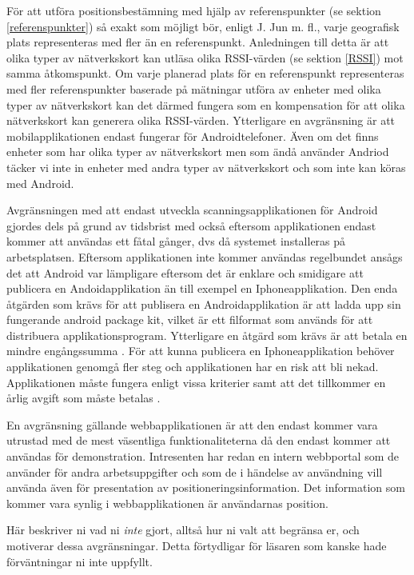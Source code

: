 \documentclass[swedish, a4paper,12pt]{article}
\begin{document}
För att utföra positionsbestämning med hjälp av referenspunkter (se sektion \ref{referenspunkter}) så exakt som möjligt bör, enligt J. Jun m. fl., varje geografisk plats representeras med fler än en referenspunkt\cite{jun2018low}.
Anledningen till detta är att olika typer av nätverkskort kan utläsa olika RSSI-värden (se sektion \ref{RSSI}) mot samma åtkomspunkt\cite{problem_with_RSSI}. Om varje planerad plats för en referenspunkt representeras med fler referenspunkter baserade på mätningar utföra av enheter med olika typer av nätverkskort kan det därmed fungera som en kompensation för att olika nätverkskort kan generera olika RSSI-värden\cite{jun2018low}.
Ytterligare en avgränsning är att mobilapplikationen endast fungerar för Androidtelefoner. Även om det finns enheter som har olika typer av nätverkskort men som ändå använder Andriod täcker vi inte in enheter med andra typer av nätverkskort och som inte kan köras med Android.

Avgränsningen med att endast utveckla scanningsapplikationen för Android gjordes dels på grund av tidsbrist med också eftersom applikationen endast kommer att användas ett fåtal gånger, dvs då systemet installeras på arbetsplatsen. Eftersom applikationen inte kommer användas regelbundet ansågs det att Android var lämpligare eftersom det är enklare och smidigare att publicera en Andoidapplikation än till exempel en Iphoneapplikation. Den enda åtgärden som krävs för att publisera en Androidapplikation är att ladda upp sin fungerande android package kit, vilket är ett filformat som används för att distribuera applikationsprogram. Ytterligare en åtgärd som krävs är att betala en mindre engångssumma \cite{android} \cite{guidePublish}. För att kunna publicera en Iphoneapplikation behöver applikationen genomgå fler steg och applikationen har en risk att bli nekad. Applikationen måste fungera enligt vissa kriterier samt att det tillkommer en årlig avgift som måste betalas \cite{submitIphone} \cite{guidePublish}.

En avgränsning gällande webbapplikationen är att den endast kommer vara utrustad med de mest väsentliga funktionaliteterna då den endast kommer att användas för demonstration. Intresenten har redan en intern webbportal som de använder för andra arbetsuppgifter och som de i händelse av användning vill använda även för presentation av positioneringsinformation. Det information som kommer vara synlig i webbapplikationen är användarnas position.

\iffalse Här beskriver ni vad ni \emph{inte} gjort, alltså hur ni valt att begränsa er, och motiverar dessa avgränsningar. Detta förtydligar för läsaren som kanske hade förväntningar ni inte uppfyllt.
\end{document}
